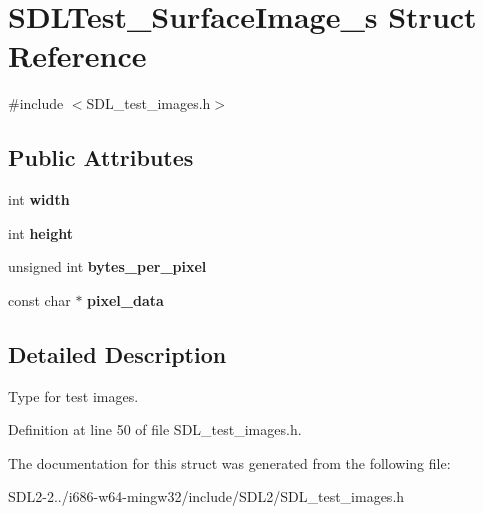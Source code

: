 \hypertarget{structSDLTest__SurfaceImage__s}{\section{S\+D\+L\+Test\+\_\+\+Surface\+Image\+\_\+s Struct Reference}
\label{structSDLTest__SurfaceImage__s}
}


{\ttfamily \#include $<$S\+D\+L\+\_\+test\+\_\+images.\+h$>$}

\subsection*{Public Attributes}
\begin{DoxyCompactItemize}
\item 
\hypertarget{structSDLTest__SurfaceImage__s_a3cbacf6b015a22832ab4d3f509719609}{int {\bfseries width}}\label{structSDLTest__SurfaceImage__s_a3cbacf6b015a22832ab4d3f509719609}

\item 
\hypertarget{structSDLTest__SurfaceImage__s_a310092874695556e4b7f1f63aec24213}{int {\bfseries height}}\label{structSDLTest__SurfaceImage__s_a310092874695556e4b7f1f63aec24213}

\item 
\hypertarget{structSDLTest__SurfaceImage__s_a2daf91bab3d79fb9dfa25e8ade43e606}{unsigned int {\bfseries bytes\+\_\+per\+\_\+pixel}}\label{structSDLTest__SurfaceImage__s_a2daf91bab3d79fb9dfa25e8ade43e606}

\item 
\hypertarget{structSDLTest__SurfaceImage__s_a2bd2637d34b1c9e09f8aa1d8652ded4f}{const char $\ast$ {\bfseries pixel\+\_\+data}}\label{structSDLTest__SurfaceImage__s_a2bd2637d34b1c9e09f8aa1d8652ded4f}

\end{DoxyCompactItemize}


\subsection{Detailed Description}
Type for test images. 

Definition at line 50 of file S\+D\+L\+\_\+test\+\_\+images.\+h.



The documentation for this struct was generated from the following file\+:\begin{DoxyCompactItemize}
\item 
S\+D\+L2-\/2../i686-\/w64-\/mingw32/include/\+S\+D\+L2/S\+D\+L\+\_\+test\+\_\+images.\+h\end{DoxyCompactItemize}
